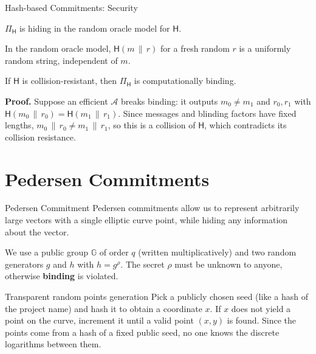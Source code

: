 \documentclass{zkdl-presentation-template}
\begin{document}
    \begin{frame}{Hash-based Commitments: Security}
        \begin{lemma}
            $\Pi_{\mathsf{H}}$ is hiding in the random oracle model for $\mathsf{H}$.
        \end{lemma}
        In the random oracle model, $\mathsf{H}(m \,\|\, r)$ for a fresh random $r$ is a uniformly random string, independent of $m$.
        \pause

        \begin{lemma}
            If $\mathsf{H}$ is collision-resistant, then $\Pi_{\mathsf{H}}$ is computationally binding.
        \end{lemma}
        \pause

        \textbf{Proof.} Suppose an efficient $\mathcal{A}$ breaks binding: it outputs $m_0 \neq m_1$ and $r_0, r_1$ with $\mathsf{H}(m_0 \,\|\, r_0) = \mathsf{H}(m_1 \,\|\, r_1)$.\pause{}
        Since messages and blinding factors have fixed lengths, $m_0 \,\|\, r_0 \neq m_1 \,\|\, r_1$, so this is a collision of $\mathsf{H}$, which contradicts its collision resistance.
    \end{frame}

    \section{Pedersen Commitments}

    \begin{frame}{Pedersen Commitment}
        Pedersen commitments allow us to represent arbitrarily large vectors with a single elliptic curve point, while hiding any information about the vector.
        \pause

        We use a public group $\mathbb{G}$ of order $q$ (written multiplicatively) and two random generators $g$ and $h$ with $h = g^{\rho}$.
        The secret $\rho$ must be unknown to anyone, otherwise \textbf{binding} is violated.
        \pause

        \begin{remarkblock}{Transparent random points generation}
            Pick a publicly chosen seed (like a hash of the project name) and hash it to obtain a coordinate $x$.
            If $x$ does not yield a point on the curve, increment it until a valid point $(x, y)$ is found.
            Since the points come from a hash of a fixed public seed, no one knows the discrete logarithms between them.
        \end{remarkblock}
    \end{frame}
\end{document}
